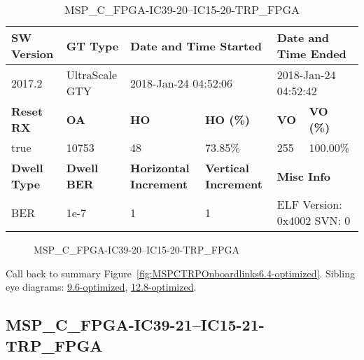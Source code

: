 \begin{table}[h]
\centering
\caption{MSP\_C\_FPGA-IC39-20--IC15-20-TRP\_FPGA}
\label{tab:MSPCFPGAIC3920IC1520TRPFPGA6.4-optimized}
\begin{tabular}{@{}|l|l|l|l|l|l|@{}}
\toprule
\textbf{SW Version}                & \textbf{GT Type}   & \multicolumn{2}{l|}{\textbf{Date and Time Started}}            & \multicolumn{2}{l|}{\textbf{Date and Time Ended}}        \\ \midrule
2017.2                       & UltraScale GTY          & \multicolumn{2}{l|}{2018-Jan-24 04:52:06}                   & \multicolumn{2}{l|}{2018-Jan-24 04:52:42}               \\ \midrule
\textbf{Reset RX}                  & \textbf{OA} & \textbf{HO}   & \textbf{HO (\%)} & \textbf{VO} & \textbf{VO (\%)} \\ \midrule
true & 10753        & 48          & 73.85\%        & 255        & 100.00\%       \\ \midrule
\textbf{Dwell Type}                & \textbf{Dwell BER} & \textbf{Horizontal Increment} & \textbf{Vertical Increment}    & \multicolumn{2}{l|}{\textbf{Misc Info}}                  \\ \midrule
BER                            & 1e-7        & 1        & 1           & \multicolumn{2}{l|}{ELF Version: 0x4002 SVN: 0}                         \\ \bottomrule
\end{tabular}
\end{table}

\begin{figure}[h]
\caption{MSP\_C\_FPGA-IC39-20--IC15-20-TRP\_FPGA} \label{fig:MSPCFPGAIC3920IC1520TRPFPGA6.4-optimized}
\end{figure}

Call back to summary Figure~\ref{fig:MSPCTRPOnboardlinks6.4-optimized}.
Sibling eye diagrams: \hyperref[sec:MSPCFPGAIC3920IC1520TRPFPGA9.6-optimized]{9.6-optimized}, \hyperref[sec:MSPCFPGAIC3920IC1520TRPFPGA12.8-optimized]{12.8-optimized}.

\clearpage
\newpage


\subsection{MSP\_C\_FPGA-IC39-21--IC15-21-TRP\_FPGA}\label{sec:MSPCFPGAIC3921IC1521TRPFPGA6.4-optimized}

